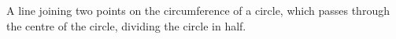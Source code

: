 A line joining two points on the circumference of a circle, which passes through
the centre of the circle, dividing the circle in half.